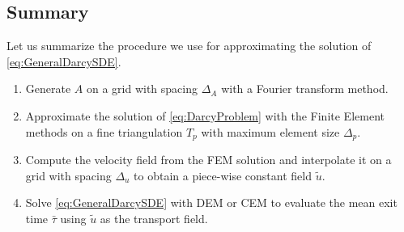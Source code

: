\subsection{Summary}

Let us summarize the procedure we use for approximating the solution of \eqref{eq:GeneralDarcySDE}. 
\begin{enumerate}
	\item Generate $A$ on a grid with spacing $\Delta_A$ with a Fourier transform method.
	\item Approximate the solution of \eqref{eq:DarcyProblem} with the Finite Element methods on a fine triangulation $T_p$ with maximum element size $\Delta_p$.
	\item Compute the velocity field from the FEM solution and interpolate it on a grid with spacing $\Delta_u$ to obtain a piece-wise constant field $\tilde{u}$.
	\item Solve \eqref{eq:GeneralDarcySDE} with DEM or CEM to evaluate the mean exit time $\bar\tau$ using $\tilde{u}$ as the transport field.
\end{enumerate}

